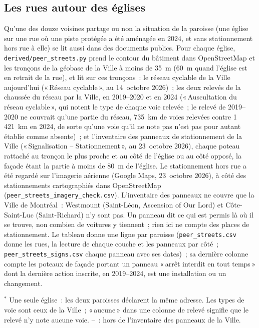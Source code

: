 \documentclass[11pt,letterpaper]{article}
\begin{document}
\subsection{Les rues autour des églises}\label{sec:streets}

Qu'une des douze voisines partage ou non la situation de la paroisse (une église sur une rue où une piste protégée a été aménagée en 2024, et sans stationnement hors rue à elle) se lit aussi dans des documents publics. Pour chaque église, \texttt{derived/peer\_streets.py} prend le contour du bâtiment dans OpenStreetMap et les tronçons de la géobase de la Ville à moins de 35~m (60~m quand l'église est en retrait de la rue), et lit sur ces tronçons~: le réseau cyclable de la Ville aujourd'hui («\,Réseau cyclable\,», au 14~octobre 2026)~; les deux relevés de la chaussée du réseau par la Ville, en 2019--2020 et en 2024 («\,Auscultation du réseau cyclable\,», qui notent le type de chaque voie relevée~; le relevé de 2019--2020 ne couvrait qu'une partie du réseau, 735~km de voies relevées contre 1\,421~km en 2024, de sorte qu'une voie qu'il ne note pas n'est pas pour autant établie comme absente)~; et l'inventaire des panneaux de stationnement de la Ville («\,Signalisation -- Stationnement\,», au 23~octobre 2026), chaque poteau rattaché au tronçon le plus proche et au côté de l'église ou au côté opposé, la façade étant la partie à moins de 80~m de l'église. Le stationnement hors rue a été regardé sur l'imagerie aérienne (Google Maps, 23~octobre 2026), à côté des stationnements cartographiés dans OpenStreetMap (\texttt{peer\_streets\_imagery\_check.csv}). L'inventaire des panneaux ne couvre que la Ville de Montréal~: Westmount (Saint-Léon, Ascension of Our Lord) et Côte-Saint-Luc (Saint-Richard) n'y sont pas. Un panneau dit ce qui est permis là où il se trouve, non combien de voitures y tiennent~; rien ici ne compte des places de stationnement. Le tableau donne une ligne par paroisse (\texttt{peer\_streets.csv} donne les rues, la lecture de chaque couche et les panneaux par côté~; \texttt{peer\_streets\_signs.csv} chaque panneau avec ses dates)~; sa dernière colonne compte les poteaux de façade portant un panneau «\,arrêt interdit en tout temps\,» dont la dernière action inscrite, en 2019--2024, est une installation ou un changement.

\begin{center}\small\resizebox{\textwidth}{!}{}\end{center}
{\footnotesize $^{*}$ Une seule église~: les deux paroisses déclarent la même adresse. Les types de voie sont ceux de la Ville~; «\,aucune\,» dans une colonne de relevé signifie que le relevé n'y note aucune voie. --~: hors de l'inventaire des panneaux de la Ville.\par}
\end{document}
